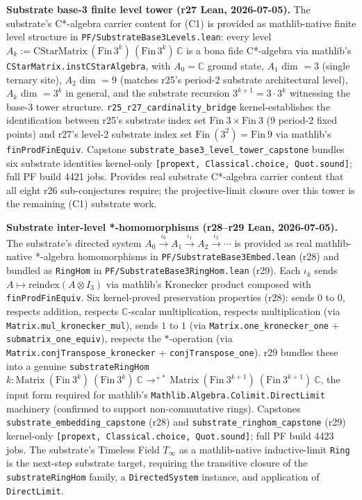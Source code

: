 \documentclass[11pt,a4paper]{amsart}
\theoremstyle{plain}
\theoremstyle{definition}
\begin{document}
\textbf{Substrate base-3 finite level tower (r27 Lean, 2026-07-05).} The substrate's C*-algebra carrier content for (C1) is provided as mathlib-native finite level structure in \texttt{PF/SubstrateBase3Levels.lean}: every level $A_k := \mathrm{CStarMatrix}\,(\mathrm{Fin}\,3^k)\,(\mathrm{Fin}\,3^k)\,\mathbb{C}$ is a bona fide C*-algebra via mathlib's \texttt{CStarMatrix.instCStarAlgebra}, with $A_0 = \mathbb{C}$ ground state, $A_1$ dim $= 3$ (single ternary site), $A_2$ dim $= 9$ (matches r25's period-2 substrate architectural level), $A_k$ dim $= 3^k$ in general, and the substrate recursion $3^{k+1} = 3 \cdot 3^k$ witnessing the base-3 tower structure. \texttt{r25\_r27\_cardinality\_bridge} kernel-establishes the identification between r25's substrate index set $\mathrm{Fin}~3 \times \mathrm{Fin}~3$ (9 period-2 fixed points) and r27's level-2 substrate index set $\mathrm{Fin}~(3^2) = \mathrm{Fin}~9$ via mathlib's \texttt{finProdFinEquiv}. Capstone \texttt{substrate\_base3\_level\_tower\_capstone} bundles six substrate identities kernel-only \texttt{[propext, Classical.choice, Quot.sound]}; full PF build 4421 jobs. Provides real substrate C*-algebra carrier content that all eight r26 sub-conjectures require; the projective-limit closure over this tower is the remaining (C1) substrate work.

\textbf{Substrate inter-level *-homomorphisms (r28--r29 Lean, 2026-07-05).} The substrate's directed system $A_0 \xrightarrow{\iota_0} A_1 \xrightarrow{\iota_1} A_2 \xrightarrow{\iota_2} \cdots$ is provided as real mathlib-native *-algebra homomorphisms in \texttt{PF/SubstrateBase3Embed.lean} (r28) and bundled as \texttt{RingHom} in \texttt{PF/SubstrateBase3RingHom.lean} (r29). Each $\iota_k$ sends $A \mapsto \mathrm{reindex}(A \otimes I_3)$ via mathlib's Kronecker product composed with \texttt{finProdFinEquiv}. Six kernel-proved preservation properties (r28): sends $0$ to $0$, respects addition, respects $\mathbb{C}$-scalar multiplication, respects multiplication (via \texttt{Matrix.mul\_kronecker\_mul}), sends $1$ to $1$ (via \texttt{Matrix.one\_kronecker\_one} + \texttt{submatrix\_one\_equiv}), respects the $*$-operation (via \texttt{Matrix.conjTranspose\_kronecker} + \texttt{conjTranspose\_one}). r29 bundles these into a genuine \texttt{substrateRingHom}~$k : \mathrm{Matrix}~(\mathrm{Fin}~3^k)~(\mathrm{Fin}~3^k)~\mathbb{C} \to^{+*} \mathrm{Matrix}~(\mathrm{Fin}~3^{k+1})~(\mathrm{Fin}~3^{k+1})~\mathbb{C}$, the input form required for mathlib's \texttt{Mathlib.Algebra.Colimit.DirectLimit} machinery (confirmed to support non-commutative rings). Capstones \texttt{substrate\_embedding\_capstone} (r28) and \texttt{substrate\_ringhom\_capstone} (r29) kernel-only \texttt{[propext, Classical.choice, Quot.sound]}; full PF build 4423 jobs. The substrate's Timeless Field $T_\infty$ as a mathlib-native inductive-limit \texttt{Ring} is the next-step substrate target, requiring the transitive closure of the \texttt{substrateRingHom} family, a \texttt{DirectedSystem} instance, and application of \texttt{DirectLimit}.
\end{document}
